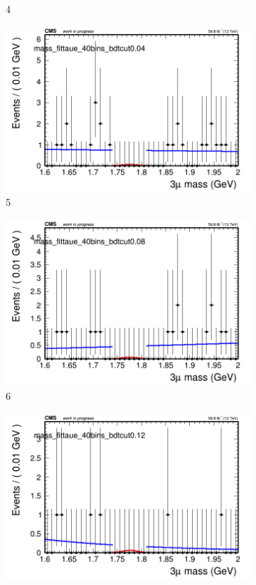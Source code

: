 \begin{figure}[h!]
\begin{subfigure}{0.2\textwidth}
        \caption{4}
    \end{subfigure}
    \begin{subfigure}{0.2\textwidth}
        \includegraphics[width=\textwidth]{power_law/plots/taue/massfit_taue_40bins_bdtcut0.04.png}
        \caption{5}
    \end{subfigure}
    \begin{subfigure}{0.2\textwidth}
        \includegraphics[width=\textwidth]{power_law/plots/taue/massfit_taue_40bins_bdtcut0.08.png}
        \caption{6}
    \end{subfigure}
    \begin{subfigure}{0.2\textwidth}
        \includegraphics[width=\textwidth]{power_law/plots/taue/massfit_taue_40bins_bdtcut0.12.png}

\end{subfigure}
\end{figure}

